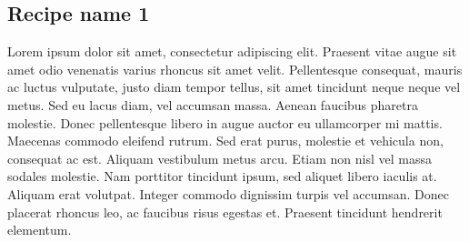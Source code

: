 
\subsection{Recipe name 1}\label{recipe1}


Lorem ipsum dolor sit amet, consectetur adipiscing elit. Praesent vitae augue sit amet odio venenatis varius rhoncus sit amet velit. Pellentesque consequat, mauris ac luctus vulputate, justo diam tempor tellus, sit amet tincidunt neque neque vel metus. Sed eu lacus diam, vel accumsan massa. Aenean faucibus pharetra molestie. Donec pellentesque libero in augue auctor eu ullamcorper mi mattis. Maecenas commodo eleifend rutrum. Sed erat purus, molestie et vehicula non, consequat ac est. Aliquam vestibulum metus arcu. Etiam non nisl vel massa sodales molestie. Nam porttitor tincidunt ipsum, sed aliquet libero iaculis at. Aliquam erat volutpat. Integer commodo dignissim turpis vel accumsan. Donec placerat rhoncus leo, ac faucibus risus egestas et. Praesent tincidunt hendrerit elementum.